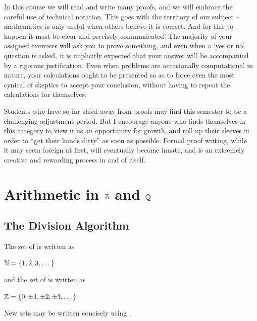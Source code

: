 \documentclass[11pt,fleqn,dvipsnames,usenames]{article}
\newcommand{\p}{\noindent}
\begin{document}
\p In this course we will read and write many proofs, and we will embrace the careful use of technical notation.  This goes with the territory of our subject -- mathematics is only useful when others believe it is correct.  And for this to happen it must be clear and precisely communicated!  The majority of your assigned exercises will ask you to prove something, and even when a `yes or no' question is asked, it is implicitly expected that your answer will be accompanied by a rigorous justification.  Even when problems are occasionally computational in nature, your calculations ought to be presented so as to force even the most cynical of skeptics to accept your conclusion, without having to repeat the calculations for themselves.
\vsp

\p Students who have so far shied away from proofs may find this semester to be a challenging adjustment period.  But I encourage anyone who finds themselves in this category to view it as an opportunity for growth, and roll up their sleeves in order to ``get their hands dirty'' as soon as possible.  Formal proof writing, while it may seem foreign at first, will eventually become innate, and is an extremely creative and rewarding process in and of itself.
\newpage

\tableofcontents
\newpage


\section{Arithmetic in \texorpdfstring{$\mathbb{Z}$ and $\mathbb{Q}$}{Z and Q}}
\setcounter{subsection}{0}

\subsection{The Division Algorithm}

The set of  is written as
\begin{center}
$\mathbb{N} = \left\{1,2,3,\dots\right\}$
\end{center}
and the set of  is written as
\begin{center}
\item $\mathbb{Z} = \left\{0, \pm 1, \pm 2,\pm 3,\dots\right\}$
\end{center}
\vsp

\p New sets may be written concisely using .
\vsp
\end{document}

